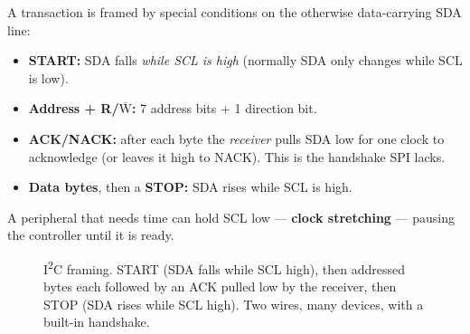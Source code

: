 \documentclass[11pt,a4paper,oneside]{book}
\begin{document}
A transaction is framed by special conditions on the otherwise data-carrying SDA
line:
\begin{itemize}[leftmargin=1.4cm]
  \item \textbf{START:} SDA falls \emph{while SCL is high} (normally SDA only
        changes while SCL is low).
  \item \textbf{Address + R/$\overline{\text{W}}$:} 7 address bits + 1 direction
        bit.
  \item \textbf{ACK/NACK:} after each byte the \emph{receiver} pulls SDA low for
        one clock to acknowledge (or leaves it high to NACK). This is the
        handshake SPI lacks.
  \item \textbf{Data bytes}, then a \textbf{STOP:} SDA rises while SCL is high.
\end{itemize}
A peripheral that needs time can hold SCL low --- \textbf{clock stretching} ---
pausing the controller until it is ready.

\begin{figure}[h]
\centering
{}
\caption{I\textsuperscript{2}C framing. START (SDA falls while SCL high), then
addressed bytes each followed by an ACK pulled low by the receiver, then STOP
(SDA rises while SCL high). Two wires, many devices, with a built-in handshake.}
\label{fig:i2c-timing}
\end{figure}
\end{document}
